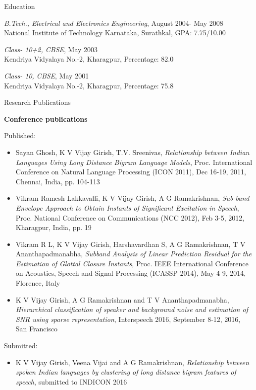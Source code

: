 \documentclass[10pt]{article}
\newenvironment{subbulletlist}{%
	\begin{list}{\labelitemii}{%
		\setlength{\topsep}{\itemsep}\setlength{\parskip}{\parsep}%
	}%
}%
{ \end{list} }
\begin{document}
\begin{cv}
\begin{cvlist}{Education}
\begin{subbulletlist}
	\end{subbulletlist}
	\item \emph{B.Tech., Electrical and Electronics Engineering}, August 2004- May 2008\\
	National Institute of Technology Karnataka, Surathkal, GPA: 7.75/10.00
	\item \emph{Class- 10+2, CBSE}, May 2003 \\
	Kendriya Vidyalaya No.-2, Kharagpur, Percentage: 82.0
	\item \emph{Class- 10, CBSE}, May 2001 \\
	Kendriya Vidyalaya No.-2, Kharagpur, Percentage: 75.8
\end{cvlist}


\begin{cvlist}{Research Publications}
\item \textbf{Conference publications}
\item Published:
	\begin{itemize}\itemsep=0.25em
	\item Sayan Ghosh, K V Vijay Girish, T.V. Sreenivas, \textit{Relationship between Indian Languages Using Long Distance Bigram Language Models}, Proc. International Conference on Natural Language Processing (ICON
2011), Dec 16-19, 2011, Chennai, India, pp. 104-113


\item
Vikram Ramesh Lakkavalli, K V Vijay Girish, A G Ramakrishnan, \textit{Sub-band Envelope Approach to Obtain Instants of Significant Excitation in Speech}, Proc. National Conference on Communications (NCC 2012), Feb 3-5, 2012, Kharagpur, India, pp. 19

\item Vikram R L, K V Vijay Girish, Harshavardhan S, A G Ramakrishnan, T V Ananthapadmanabha, 
\textit{Subband Analysis of Linear Prediction Residual for the Estimation of Glottal Closure Instants}, Proc. IEEE International Conference on Acoustics, Speech and Signal Processing (ICASSP 2014), May 4-9, 2014, Florence, Italy

\item	K V Vijay Girish, A G Ramakrishnan and T V Ananthapadmanabha, \textit{Hierarchical classification of speaker and background noise and estimation of SNR using sparse representation}, Interspeech 2016, September 8-12, 2016, San Francisco
	\end{itemize}
\item Submitted:

\begin{itemize}
\item  K V Vijay Girish, Veena Vijai and A G Ramakrishnan,  \textit{Relationship between spoken Indian languages by clustering of long distance bigram features of speech}, submitted to INDICON 2016


\end{itemize}
\end{cvlist}
\end{cv}
\end{document}
